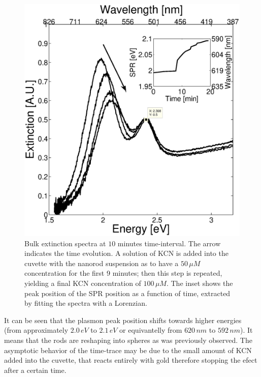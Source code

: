\documentclass[twocolumn]{article}
\begin{document}
\begin{figure}[htbp]
 \centering 
 \includegraphics[width=0.95\linewidth]{plasmon_bulk.eps}
 \caption{Bulk extinction spectra at $10$ minutes time-interval. The arrow
 indicates the time evolution. A solution of KCN is added into the cuvette with
 the nanorod suspension as to have a $50\,\mu M$ concentration for the first 9
 minutes; then this step is repeated, yielding a final KCN concentration of
 $100\, \mu M$. The inset shows the peak position of the SPR position as a
 function of time, extracted by fitting the spectra with a Lorenzian.  }
 \label{fig:bulk}
\end{figure}

It can be seen that the plasmon peak position shifts towards higher energies
(from approximately $2.0\,eV$ to $2.1\,eV$ or equivantelly from $620\,nm$ to
$592\,nm$). It means that the rods are reshaping into spheres as was previously
observed\cite{janaanisotropic2002}. The asymptotic behavior of the time-trace
may be due to the small amount of KCN added into the cuvette, that reacts
entirely with gold therefore stopping the efect after a certain time.
\end{document}
